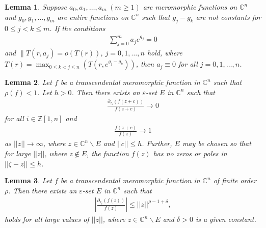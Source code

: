 \documentclass[11pt,reqno]{amsart}
\newtheorem{lem}{Lemma}[section]
\numberwithin{equation}{section}
\begin{document}
\begin{lem}\label{L2.5}\cite[Corollary 4.5]{Berenstein-Chang-Li-1994} Suppose $a_0 ,a_1,\ldots,a_m\; (m\geq 1)$ are meromorphic functions on $\mathbb{C}^n$ and $g_0,g_1,\ldots,g_m$ are entire functions on $\mathbb{C}^n$ such that $g_j-g_k$ are not constants for $0\leq j<k\leq m$. If the conditions 
\begin{align*}
\sum\limits_{j=0}^m a_je^{g_j}=0
\end{align*}
and $\parallel T(r,a_j)=o(T(r))$, $j=0,1,\ldots,n$
hold, where $T(r)=\max_{0\leq k<j\leq n}(T(r,e^{g_j-g_k}))$,
then $a_j\equiv 0$ for all $j=0,1,\ldots,n$.
\end{lem}

\begin{lem}\label{L2.6}\cite{MS1} Let $f$ be a transcendental meromorphic function in $\mathbb{C}^n$ such that $\rho(f)<1$. Let $h>0$. Then there exists an $\varepsilon$-set $E$ in $\mathbb{C}^n$ such that
\begin{align*}
\frac{\partial_{z_i}(f(z+c))}{f(z+c)}\rightarrow 0
\end{align*}
for all $i\in\mathbb{Z}[1,n]$ and 
\begin{align*}
\frac{f(z+c)}{f(z)}\rightarrow 1
\end{align*}
as $||z||\rightarrow \infty$, where $z\in\mathbb{C}^n\backslash  E$ and $||c||\leq h$. Further, $E$ may be chosen so that for large $||z||$, where $z\not\in E$, the function $f(z)$ has no zeros or poles in $||\zeta-z||\leq h$.
\end{lem}

\begin{lem}\label{L2.7}\cite{MS1} Let $f$ be a transcendental meromorphic function in $\mathbb{C}^n$ of finite order $\rho$. 
Then there exists an $\varepsilon$-set $E$ in $\mathbb{C}^n$ such that
\begin{align*}
 \displaystyle \left|\frac{\partial_{z_i}(f(z))}{f(z)}\right|\leq ||z||^{\rho-1+\delta},
 \end{align*}
holds for all large values of $||z||$, where $z\in \mathbb{C}^n\backslash E$ and $\delta>0$ is a given constant. 
\end{lem}
\end{document}
